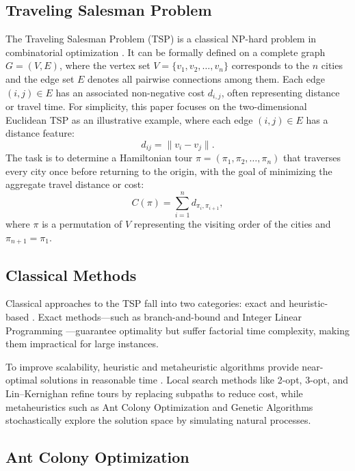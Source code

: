 \documentclass[a4paper,conference]{IEEEtran}
\begin{document}
\subsection{Traveling Salesman Problem}
The Traveling Salesman Problem (TSP) is a classical NP-hard problem in combinatorial optimization \cite{Applications}. It can be formally defined on a complete graph $G=(V,E)$, where the vertex set $V=\{v_1,v_2,\dots,v_n\}$ corresponds to the $n$ cities and the edge set $E$ denotes all pairwise connections among them. Each edge $(i,j)\in E$ has an associated non-negative cost $d_{i,j}$, often representing distance or travel time. For simplicity, this paper focuses on the two-dimensional Euclidean TSP as an illustrative example, where each edge $(i,j)\in E$ has a distance feature:
\begin{equation}
d_{ij} = \|v_i - v_j\|.
\end{equation}
The task is to determine a Hamiltonian tour $\pi = (\pi_1, \pi_2, \dots, \pi_n)$ that traverses every city once before returning to the origin, with the goal of minimizing the aggregate travel distance or cost:
\begin{equation}
C(\pi) = \sum_{i=1}^n d_{\pi_i,\pi_{i+1}},
\end{equation}
where $\pi$ is a permutation of $V$ representing the visiting order of the cities and $\pi_{n+1}=\pi_1$.

\subsection{Classical Methods}
Classical approaches to the TSP fall into two categories: exact and heuristic-based \cite{TSP2}. Exact methods—such as branch-and-bound \cite{branch} and Integer Linear Programming \cite{LP}—guarantee optimality but suffer factorial time complexity, making them impractical for large instances.

To improve scalability, heuristic and metaheuristic algorithms provide near-optimal solutions in reasonable time \cite{MetaHeuristic}. Local search methods like 2-opt, 3-opt, and Lin–Kernighan \cite{twoopt,LKH} refine tours by replacing subpaths to reduce cost, while metaheuristics such as Ant Colony Optimization \cite{ACO} and Genetic Algorithms \cite{GA} stochastically explore the solution space by simulating natural processes.

\subsection{Ant Colony Optimization}
\end{document}
